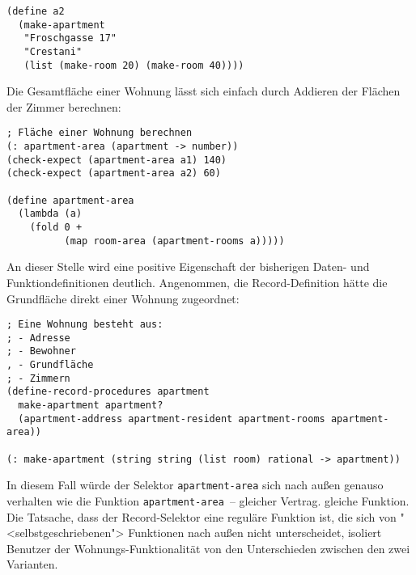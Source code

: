 %
%
\begin{verbatim}
(define a2
  (make-apartment
   "Froschgasse 17"
   "Crestani"
   (list (make-room 20) (make-room 40))))
\end{verbatim}
%
Die Gesamtfläche einer Wohnung lässt sich einfach durch Addieren der
Flächen der Zimmer berechnen:
%
\begin{verbatim}
; Fläche einer Wohnung berechnen
(: apartment-area (apartment -> number))            
(check-expect (apartment-area a1) 140)
(check-expect (apartment-area a2) 60)

(define apartment-area
  (lambda (a)
    (fold 0 +
          (map room-area (apartment-rooms a)))))
\end{verbatim}
%
An dieser Stelle wird eine positive Eigenschaft der bisherigen Daten-
und Funktiondefinitionen deutlich.  Angenommen, die Record-Definition
hätte die Grundfläche direkt einer Wohnung zugeordnet:
%
\begin{verbatim}
; Eine Wohnung besteht aus:
; - Adresse
; - Bewohner
, - Grundfläche
; - Zimmern
(define-record-procedures apartment
  make-apartment apartment?
  (apartment-address apartment-resident apartment-rooms apartment-area))

(: make-apartment (string string (list room) rational -> apartment))
\end{verbatim}
%
In diesem Fall würde der Selektor \texttt{apartment-area} sich nach
außen genauso verhalten wie die Funktion \texttt{apartment-area}~--
gleicher Vertrag. gleiche Funktion.  Die Tatsache, dass der
Record-Selektor eine reguläre Funktion ist, die sich von
"<selbstgeschriebenen"> Funktionen nach außen nicht unterscheidet,
isoliert Benutzer der Wohnungs-Funktionalität von den Unterschieden
zwischen den zwei Varianten.

